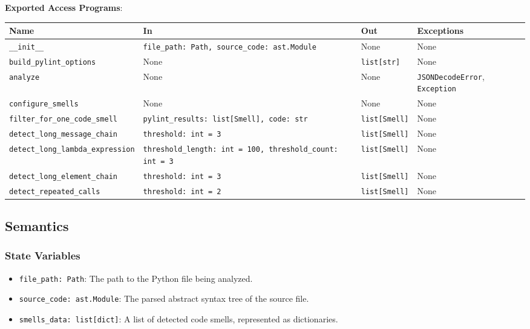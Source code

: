 \documentclass[12pt, titlepage]{article}
\begin{document}
\noindent
\textbf{Exported Access Programs}:\\
{\footnotesize
\begin{tabularx}{\linewidth}{|
    l|
    >{\raggedright\arraybackslash}X|
    l|
    l|}
  \toprule Name & In & Out & Exceptions \\
  \midrule
  \texttt{\_\_init\_\_} & \texttt{file\_path: Path, source\_code: ast.Module} & None & None \\
  \hline
  \texttt{build\_pylint\_options} & None & \texttt{list[str]} & None \\
  \hline
  \texttt{analyze} & None & None & \texttt{JSONDecodeError}, \texttt{Exception} \\
  \hline
  \texttt{configure\_smells} & None & None & None \\
  \hline
  \texttt{filter\_for\_one\_code\_smell} & \texttt{pylint\_results: list[Smell], code: str} & \texttt{list[Smell]} & None \\
  \hline
  \texttt{detect\_long\_message\_chain} & \texttt{threshold: int = 3} & \texttt{list[Smell]} & None \\
  \hline
  \texttt{detect\_long\_lambda\_expression} & \texttt{threshold\_length: int = 100, threshold\_count: int = 3} & \texttt{list[Smell]} & None \\
  \hline
  \texttt{detect\_long\_element\_chain} & \texttt{threshold: int = 3} & \texttt{list[Smell]} & None \\
  \hline
  \texttt{detect\_repeated\_calls} & \texttt{threshold: int = 2} & \texttt{list[Smell]} & None \\
  \bottomrule
\end{tabularx}
}

\subsection{Semantics}

\subsubsection{State Variables}
\begin{itemize}
  \item \texttt{file\_path: Path}: The path to the Python file being analyzed.
  \item \texttt{source\_code: ast.Module}: The parsed abstract syntax tree of the source file.
  \item \texttt{smells\_data: list[dict]}: A list of detected code smells, represented as dictionaries.
\end{itemize}
\end{document}
